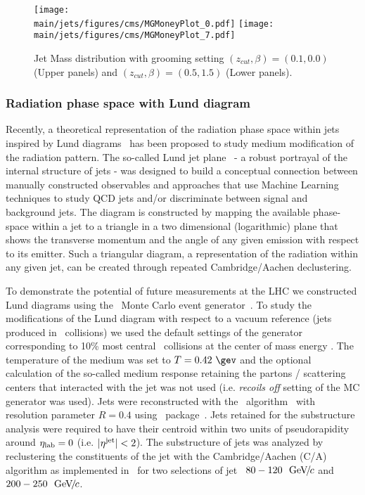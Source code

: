 %
\begin{figure}[!ht]
\begin{center}
\texttt{[image: \\main/jets/figures/cms/MGMoneyPlot\_0.pdf]}
\texttt{[image: \\main/jets/figures/cms/MGMoneyPlot\_7.pdf]}
\caption{Jet Mass distribution with grooming setting $(z_{cut},\beta)=(0.1,0.0)$ (Upper panels) and $(z_{cut},\beta)=(0.5,1.5)$ (Lower panels).~\cite{CMS-FTR-17-002:2017dec}}
\label{fig:Mass}
\end{center}
\end{figure}


\newpage
\subsubsection{Radiation phase space with Lund diagram}

Recently, a theoretical representation of the radiation phase space within jets inspired by Lund diagrams~\cite{Andersson:1988gp} has been proposed to study medium modification of the radiation pattern. The so-called Lund jet plane~\cite{Dreyer:2018nbf} - a robust portrayal of the internal structure of jets - was designed to build a conceptual connection between manually constructed observables and approaches that use Machine Learning techniques to study QCD jets and/or discriminate between signal and background jets.
The diagram is constructed by mapping the available phase-space within a jet to a triangle in a two dimensional (logarithmic) plane that shows the transverse momentum and the angle of any given emission with respect to its emitter.
Such a triangular diagram, a representation of the radiation within any given jet, can be created through repeated Cambridge/Aachen declustering.

To demonstrate the potential of future measurements at the LHC we constructed Lund diagrams using the \jewel\ Monte Carlo event generator~\cite{Zapp:2013vla}.
To study the modifications of the Lund diagram with respect to a vacuum reference (jets produced in \pp\ collisions) we used the default settings of the generator corresponding to 10\% most central \PbPb\ collisions at the center of mass energy .
The temperature of the medium was set to $T=0.42~\gev$ and the optional calculation of the so-called medium response retaining the partons / scattering centers that interacted with the jet was not used (i.e. {\it recoils off} setting of the MC generator was used).
Jets were reconstructed with the \akt\ algorithm~\cite{Cacciari:2008gp} with resolution parameter $R=0.4$ using \fastjet\ package~\cite{Cacciari:2011ma,Cacciari:2005hq}.
Jets retained for the substructure analysis were required to have their centroid within two units of pseudorapidity around $\eta_{\rm lab}=0$ (i.e. $|\eta^{\rm jet}| < 2$).
The substructure of jets was analyzed by reclustering the constituents of the jet with the Cambridge/Aachen (C/A) algorithm as implemented in \fastjet\ for two selections of jet \pt\ $80-120~~\text{GeV}\!/\mspace{-2mu}c$ and $200-250~~\text{GeV}\!/\mspace{-2mu}c$.


